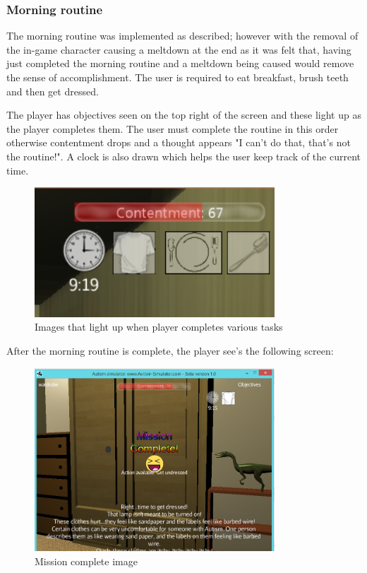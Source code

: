 \documentclass[11pt]{report}
\begin{document}
\subsubsection{Morning routine}
The morning routine was implemented as described; however with the removal of the in-game character causing a meltdown at the end as it was felt that, having just completed the morning routine and a meltdown being caused would remove the sense of accomplishment. The user is required to eat breakfast, brush teeth and then get dressed.

The player has objectives seen on the top right of the screen and these light up as the player completes them. The user must complete the routine in this order otherwise contentment drops and a thought appears "I can't do that, that's not the routine!". A clock is also drawn which helps the user keep track of the current time.

\begin{figure}[H]
\centering
\includegraphics[width=90mm]{images/implementationfirst/gameimages/morning_objectives.png}
\caption{Images that light up when player completes various tasks}
\label{old_house}
\end{figure}


After the morning routine is complete, the player see's the following screen:

\begin{figure}[H]
\centering
\includegraphics[width=90mm]{images/implementationfirst/gameimages/mission_complete.png}
\caption{Mission complete image}
\label{old_house}
\end{figure}
\end{document}
